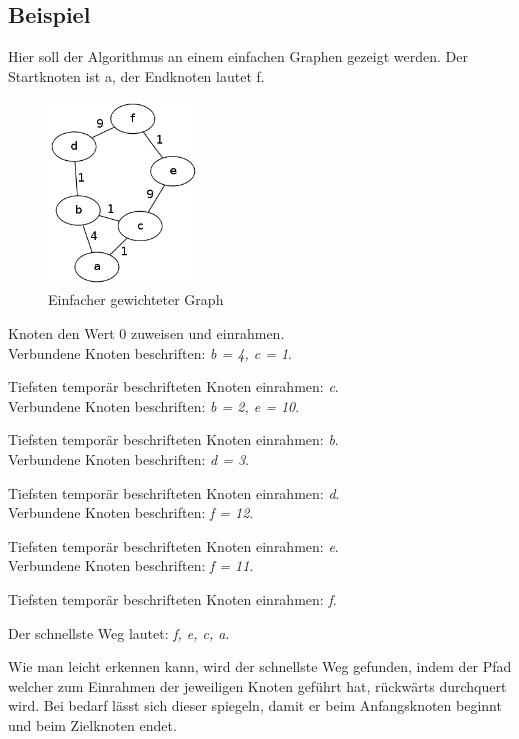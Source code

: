 \documentclass[a4paper,titlepage]{article}
\begin{document}
\subsection{Beispiel}

Hier soll der Algorithmus an einem einfachen Graphen gezeigt werden. Der Startknoten ist a, der Endknoten lautet f.

\begin{figure}
\vspace{-5pt}
\begin{center}
	\includegraphics[width=4cm]{example.png}
\end{center}
\caption{Einfacher gewichteter Graph}
\vspace{-60pt}
\end{figure}

Knoten den Wert 0 zuweisen und einrahmen. \\ Verbundene Knoten beschriften: \emph{b = 4, c = 1}.

Tiefsten temporär beschrifteten Knoten einrahmen: \emph{c}. \\ Verbundene Knoten beschriften: \emph{b = 2, e = 10}.

Tiefsten temporär beschrifteten Knoten einrahmen: \emph{b}. \\ Verbundene Knoten beschriften: \emph{d = 3}.

Tiefsten temporär beschrifteten Knoten einrahmen: \emph{d}. \\ Verbundene Knoten beschriften: \emph{f = 12}.

Tiefsten temporär beschrifteten Knoten einrahmen: \emph{e}. \\ Verbundene Knoten beschriften: \emph{f = 11}.

Tiefsten temporär beschrifteten Knoten einrahmen: \emph{f}.

Der schnellste Weg lautet: \emph{f, e, c, a}.

\vspace{10pt}

Wie man leicht erkennen kann, wird der schnellste Weg gefunden, indem der Pfad welcher zum Einrahmen der jeweiligen Knoten geführt hat, rückwärts durchquert wird. Bei bedarf lässt sich dieser spiegeln, damit er beim Anfangsknoten beginnt und beim Zielknoten endet.
\end{document}

